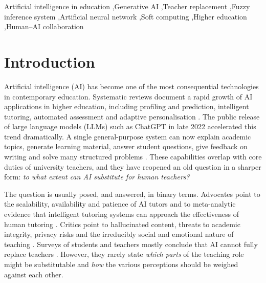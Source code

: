 \documentclass[preprint,12pt,authoryear]{elsarticle}
\theoremstyle{remark}
\begin{document}
\begin{frontmatter}
\begin{keyword}
Artificial intelligence in education \sep Generative AI \sep Teacher replacement \sep Fuzzy inference system \sep Artificial neural network \sep Soft computing \sep Higher education \sep Human--AI collaboration
\end{keyword}

\end{frontmatter}
\onehalfspacing
\linenumbers

\section{Introduction}
\label{sec:intro}

Artificial intelligence (AI) has become one of the most consequential technologies in contemporary education. Systematic reviews document a rapid growth of AI applications in higher education, including profiling and prediction, intelligent tutoring, automated assessment and adaptive personalisation \citep{zawacki2019,crompton2023,bond2024}. The public release of large language models (LLMs) such as ChatGPT in late 2022 accelerated this trend dramatically. A single general-purpose system can now explain academic topics, generate learning material, answer student questions, give feedback on writing and solve many structured problems \citep{kasneci2023,dwivedi2023}. These capabilities overlap with core duties of university teachers, and they have reopened an old question in a sharper form: \emph{to what extent can AI substitute for human teachers?} \citep{selwyn2019,popenici2017}

The question is usually posed, and answered, in binary terms. Advocates point to the scalability, availability and patience of AI tutors and to meta-analytic evidence that intelligent tutoring systems can approach the effectiveness of human tutoring \citep{vanlehn2011,kulik2016}. Critics point to hallucinated content, threats to academic integrity, privacy risks and the irreducibly social and emotional nature of teaching \citep{rudolph2023,cotton2024,unesco2023}. Surveys of students and teachers mostly conclude that AI cannot fully replace teachers \citep{chantsi2024,chanhu2023}. However, they rarely state \emph{which parts} of the teaching role might be substitutable and \emph{how} the various perceptions should be weighed against each other.
\end{document}
